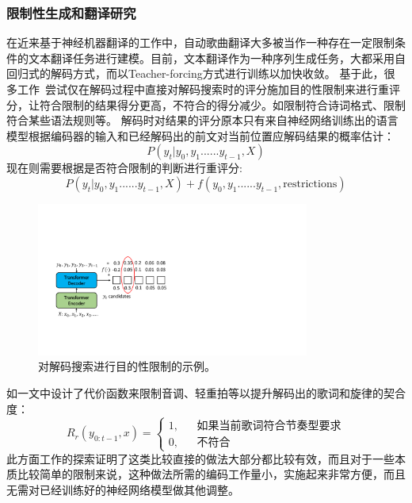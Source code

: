 \subsubsection{限制性生成和翻译研究}
在近来基于神经机器翻译的工作\citep{gagast}中，自动歌曲翻译大多被当作一种存在一定限制条件的文本翻译任务进行建模。目前，文本翻译作为一种序列生成任务，大都采用自回归式的解码方式，而以Teacher-forcing方式进行训练以加快收敛。
基于此，很多工作~\citep{hokamp-liu-2017-lexically,zou_controllable,relyme}尝试仅在解码过程中直接对解码搜索时的评分施加目的性限制来进行重评分，让符合限制的结果得分更高，不符合的得分减少。如限制符合诗词格式、限制符合某些语法规则等。
解码时对结果的评分原本只有来自神经网络训练出的语言模型根据编码器的输入和已经解码出的前文对当前位置应解码结果的概率估计：
\begin{equation}
  P(y_t|y_0,y_1......y_{t-1}, X)
\end{equation}
现在则需要根据是否符合限制的判断进行重评分:
\begin{equation}
  P(y_t|y_0,y_1......y_{t-1}, X)+f(y_0,y_1......y_{t-1}, \mbox{restrictions})
\end{equation}
\begin{figure}[ht]
  \centering
  \includegraphics[width=0.80\textwidth]{figure/related/decoded_constrain.pdf}
  \caption{对解码搜索进行目的性限制的示例。}
\end{figure}
如\citet{relyme}一文中设计了代价函数来限制音调、轻重拍等以提升解码出的歌词和旋律的契合度：
\begin{equation*}
  R_r(y_{0:t-1},x) = \left\{
  \begin{array}{rcl}
    1, & & {\mbox{如果当前歌词符合节奏型要求}} \\
    0, & & {\mbox{不符合}}
  \end{array}
  \right.
\end{equation*}
%
此方面工作的探索证明了这类比较直接的做法大部分都比较有效，而且对于一些本质比较简单的限制来说，这种做法所需的编码工作量小，实施起来非常方便，而且无需对已经训练好的神经网络模型做其他调整。

